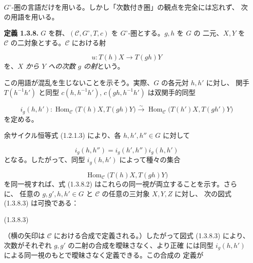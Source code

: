 \clearpage
{}%
$G^\circ$-圏の言語だけを用いる。しかし「次数付き圏」の観点を完全には忘れず、
次の用語を用いる。

\noindent\textbf{定義 1.3.8.}\quad
$G$ を群、$(\mathcal C,G^\circ,T,c)$ を $G^\circ$-圏とする。$g,h$ を $G$ の
二元、$X,Y$ を $\mathcal C$ の二対象とする。$\mathcal C$ における射

\[
  u\colon T(h)X\longrightarrow T(gh)Y
\]
を、\emph{$X$ から $Y$ への次数 $g$ の射}という。

この用語が混乱を生じないことを示そう。実際、$G$ の各元対 $h,h'$ に対し、
関手 $T(h^{-1}h')$ と同型 $c(h,h^{-1}h')$, $c(gh,h^{-1}h')$ は双関手的同型

\begin{equation}
  i_g(h,h')\colon
  \operatorname{Hom}_{\mathcal C}\bigl(T(h)X,T(gh)Y\bigr)
  \overset{\sim}{\longrightarrow}
  \operatorname{Hom}_{\mathcal C}\bigl(T(h')X,T(gh')Y\bigr)
  \tag{1.3.8.1}
\end{equation}
を定める。

余サイクル恒等式 (1.2.1.3) により、各 $h,h',h''\in G$ に対して

\begin{equation}
  i_g(h,h'')=i_g(h',h'')i_g(h,h')
  \tag{1.3.8.2}
\end{equation}
となる。したがって、同型 $i_g(h,h')$ によって種々の集合

\[
  \operatorname{Hom}_{\mathcal C}\bigl(T(h)X,T(gh)Y\bigr)
\]
を同一視すれば、式 (1.3.8.2) はこれらの同一視が両立することを示す。さらに、
任意の $g,g',h,h'\in G$ と $\mathcal C$ の任意の三対象 $X,Y,Z$ に対し、
次の図式 (1.3.8.3) は可換である：

\begin{center}
  \hfill\textup{(1.3.8.3)}
\end{center}

（横の矢印は $\mathcal C$ における合成で定義される。）したがって図式
(1.3.8.3) により、次数がそれぞれ $g,g'$ の二射の合成を曖昧さなく、より正確
には同型 $i_g(h,h')$ による同一視のもとで曖昧さなく定義できる。この合成の
定義が
